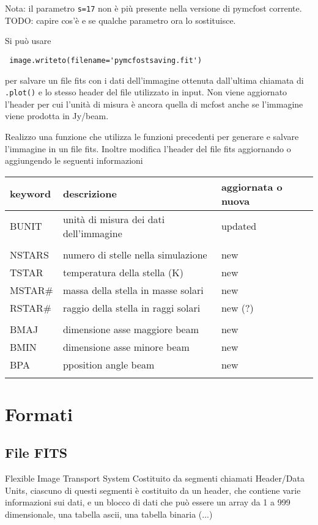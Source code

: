 \documentclass[DIN, pagenumber=false, fontsize=11pt, parskip=half]{scrartcl}
\begin{document}
Nota: il parametro \lstinline{s=17} non è più presente nella versione di pymcfost corrente. TODO: capire cos'è e se qualche parametro ora lo sostituisce.

Si può usare
\begin{lstlisting}
 image.writeto(filename='pymcfostsaving.fit')
\end{lstlisting}
per salvare un file fits con i dati dell'immagine ottenuta dall'ultima chiamata di \lstinline{.plot()} e lo stesso header del file utilizzato in input. Non viene aggiornato l'header per cui l'unità di misura è ancora quella di mcfost anche se l'immagine viene prodotta in Jy/beam.       

Realizzo una funzione che utilizza le funzioni precedenti per generare e salvare l'immagine in un file fits. Inoltre modifica l'header del file fits aggiornando o aggiungendo le seguenti informazioni

\begin{center}
\begin{tabular}{l l l}
\toprule
keyword & descrizione & aggiornata o nuova\\
\midrule       
BUNIT & unità di misura dei dati dell'immagine & updated \\ \\
NSTARS & numero di stelle nella simulazione & new \\
TSTAR & temperatura della stella (K) & new \\
MSTAR\# & massa della stella in masse solari & new \\
RSTAR\# & raggio della stella in raggi solari & new (?) \\ \\
BMAJ & dimensione asse maggiore beam & new \\
BMIN & dimensione asse minore beam & new \\
BPA & pposition angle beam & new \\ \\

 \bottomrule
\end{tabular}
\end{center}
\section{Formati}

\subsection{File FITS}
Flexible Image Transport System
Costituito da segmenti chiamati Header/Data Units, ciascuno di questi segmenti è costituito da un header, che contiene varie informazioni sui dati, e un blocco di dati che può essere un array da 1 a 999 dimensionale, una tabella ascii, una tabella binaria (...)
\end{document}
